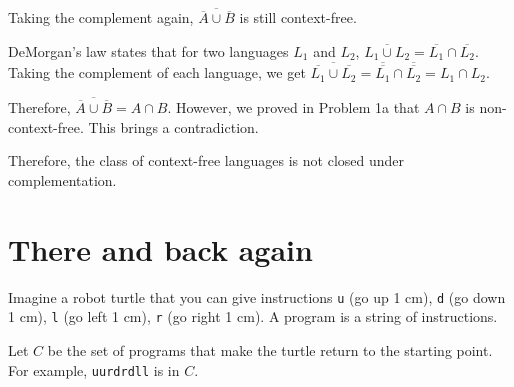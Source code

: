 \documentclass{article}
\begin{document}
\begin{enumerate}[(a)]
            Taking the complement again, $\overline{\overline{A} \cup \overline{B}}$ is still context-free.

            DeMorgan's law states that for two languages $L_1$ and $L_2$, $\overline{L_1 \cup L_2} = \overline{L_1} \cap \overline{L_2}$. Taking the complement of each language, we get $\overline{\overline{L_1} \cup \overline{L_2}} = \overline{\overline{L_1}} \cap \overline{\overline{L_2}} = L_1 \cap L_2$.

            Therefore, $\overline{\overline{A} \cup \overline{B}} = A \cap B$. However, we proved in Problem 1a that $A \cap B$ is non-context-free. This brings a contradiction.

            Therefore, the class of context-free languages is not closed under complementation.


    \end{enumerate}

    \section{There and back again}

    Imagine a robot turtle that you can give instructions \texttt{u} (go up 1 cm), \texttt{d} (go down 1 cm), \texttt{l} (go left 1 cm), \texttt{r} (go right 1 cm). A program is a string of instructions.

    Let $C$ be the set of programs that make the turtle return to the starting point. For example, \texttt{uurdrdll} is in $C$.
\end{document}
